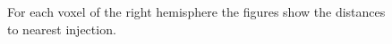 \documentclass[a4paper]{article}
\begin{document}
	\begin{figure}[ht!]
   	\begin{center}
    	   \end{center}
    	\caption{%
        For each voxel of the right hemisphere the figures show the distances to nearest injection. 
     }%
   \label{fig:distance}
   \end{figure}
\end{document}
